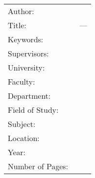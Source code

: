 \footnotesize
\noindent \hspace{-3mm}
\begin{tabular}{L{.23\textwidth}L{.75\textwidth}}
	Author: & \myName \\
	Title: & \myTitle ~--- \mySubtitle \\
	Keywords: & \myKeywords \\
	Supervisors: &\mySupervisor \\
	University: & \myUni \\
	Faculty: & \myFaculty \\
	Department: & \myDepartment \\
	Field of Study: & \myDegree \\ 
	Subject: & \mySubject\\
	Location: & \myLocation \\
	Year: & \myTime \\
	Number of Pages: & \pageref{LastPage}
\end{tabular}

\normalsize